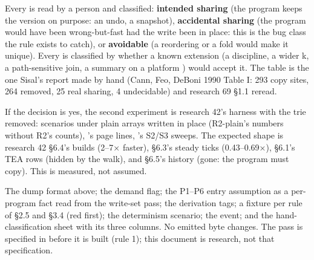 
Every  is read by a person and classified: \textbf{intended sharing} (the program keeps the version on purpose: an undo, a snapshot), \textbf{accidental sharing} (the program would have been wrong-but-fast had the write been in place: this is the bug class the rule exists to catch), or \textbf{avoidable} (a reordering or a fold would make it unique). Every  is classified by whether a known extension (a  discipline, a wider k, a path-sensitive join, a summary on a platform ) would accept it. The table is the one Sisal's report made by hand (Cann, Feo, DeBoni 1990 Table I: 293 copy sites, 264 removed, 25 real sharing, 4 undecidable) and research 69 §1.1 reread.


If the decision is yes, the second experiment is research 42's harness with the trie removed:  scenarios under plain arrays written in place (R2-plain's numbers without R2's counts), 's page lines, 's S2/S3 sweeps. The expected shape is research 42 §6.4's builds (2–7× faster), §6.3's steady ticks (0.43–0.69×), §6.1's TEA rows (hidden by the walk), and §6.5's history (gone: the program must copy). This is measured, not assumed.


The dump format above; the demand flag; the P1–P6 entry assumption as a per-program fact read from the write-set pass; the derivation tags; a fixture per rule of §2.5 and §3.4 (red first); the determinism scenario; the  event; and the hand-classification sheet with its three columns. No emitted byte changes. The pass is specified in  before it is built (rule 1); this document is research, not that specification.
